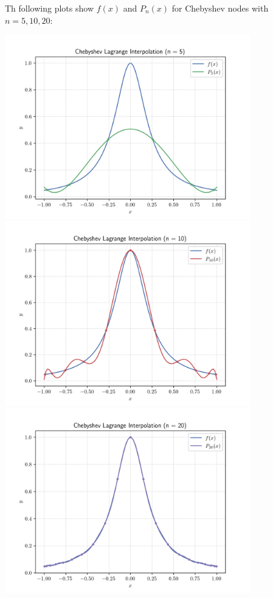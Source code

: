 \documentclass[12pt]{article}
\begin{document}
Th following plots show $f(x)$ and $P_n(x)$ for Chebyshev nodes with $n=5, 10, 20$:
\begin{center}
    \includegraphics[width=0.8\textwidth]{../plots_2/q2_3/chebyshev_p5.png}
    \includegraphics[width=0.8\textwidth]{../plots_2/q2_3/chebyshev_p10.png}
    \includegraphics[width=0.8\textwidth]{../plots_2/q2_3/chebyshev_p20.png}

\end{center}
\end{document}
